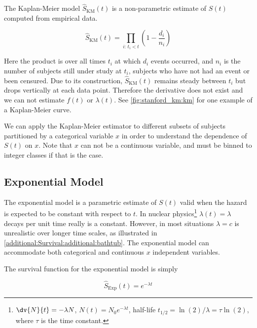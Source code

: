 The Kaplan-Meier model \cite{km} $\hat{S}_{\text{KM}}\left(t\right)$ is a non-parametric
estimate of $S\left(t\right)$ computed from empirical data.

\begin{equation}\label{eq:Survival:km}
\hat{S}_{\text{KM}}\left(t\right) = \prod_{i:\,t_{i} < t} \left(1 - \frac{d_{i}}{n_{i}}\right)
\end{equation}

\noindent Here the product is over all times $t_{i}$ at which $d_{i}$ events occurred,
and $n_{i}$ is the number of subjects still under study at $t_{i}$,
\ie subjects who have not had an event or been censured.
Due to its construction, $\hat{S}_{\text{KM}}\left(t\right)$ remains steady
between $t_{i}$ but drops vertically at each data point.
Therefore the derivative does not exist and we can not estimate $f\left(t\right)$ or $\lambda\left(t\right)$.
See \cref{fig:stanford_km:km} for one example of a Kaplan-Meier curve.

We can apply the Kaplan-Meier estimator to different subsets of subjects partitioned by a categorical variable $x$
in order to understand the dependence of $S\left(t\right)$ on $x$.
Note that $x$ can not be a continuous variable, and must be binned to integer classes if that is the case.

\subsection{Exponential Model}
\label{additional:Survival:exp}

The exponential model is a parametric estimate of $S\left(t\right)$
valid when the hazard is expected to be constant with respect to $t$.
In nuclear physics\footnote{$\dv{N}{t} = -\lambda N$, $N\left(t\right) = N_{0} e^{-\lambda t}$,
half-life $t_{1/2} = \ln\left(2\right) / \lambda = \tau \ln\left(2\right)$, where $\tau$ is the time constant.} $\lambda\left(t\right) = \lambda$
decays per unit time really is a constant.
However, in most situations $\lambda = c$ is unrealistic over longer time scales,
as illustrated in \cref{additional:Survival:additional:bathtub}.
The exponential model can accommodate both categorical and continuous $x$ independent variables.

The survival function for the exponential model is simply

\begin{equation}\label{eq:Survival:exp}
\hat{S}_{\text{Exp}}\left(t\right) = e^{-\lambda t}
\end{equation}

